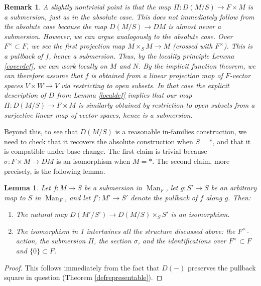 \documentclass[12pt]{article}
\newtheorem{lemma}[theorem]{Lemma}
\newtheorem{remark}[theorem]{Remark}
\newcommand{\on}{\operatorname}
\begin{document}
\begin{remark}
A slightly nontrivial point is that the map $\Pi:D(M/S)\rightarrow F\times M$ is a submersion, just as in the absolute case.  This does not immediately follow from the absolute case because the map $D(M/S)\rightarrow DM$ is almost never a submersion.  However, we can argue analogously to the absolute case.  Over $F^\times \subset F$, we see the first projection map $M\times_S M\rightarrow M$ (crossed with $F^\times$).  This is a pullback of $f$, hence a submersion.  Thus, by the locality principle Lemma \ref{coverdef}, we can work locally on $M$ and $N$.  By the implicit function theorem, we can therefore assume that $f$ is obtained from a linear projection map of $F$-vector spaces $V\times W\rightarrow V$ via restricting to open subsets.  In that case the explicit description of $D$ from Lemma \ref{localdef} implies that our map $\Pi:D(M/S)\rightarrow F\times M$ is similarly obtained by restriction to open subsets from a surjective linear map of vector spaces, hence is a submersion.
\end{remark}

Beyond this, to see that $D(M/S)$ is a reasonable in-families construction, we need to check that it recovers the absolute construction when $S=\ast$, and that it is compatible under base-change.  The first claim is trivial because $\sigma:F\times M\rightarrow DM$ is an isomorphism when $M=\ast$.  The second claim, more precisely, is the following lemma.

\begin{lemma}
Let $f:M\rightarrow S$ be a submersion in $\on{Man}_F$, let $g:S'\rightarrow S$ be an arbitrary map to $S$ in $\on{Man}_F$, and let $f':M'\rightarrow S'$ denote the pullback of $f$ along $g$.  Then:
\begin{enumerate}
\item The natural map $D(M'/S')\rightarrow D(M/S)\times_S S'$ is an isomorphism.
\item The isomorphism in 1 intertwines all the structure discussed above: the $F^\times$-action, the submersion $\Pi$, the section $\sigma$, and the identifications over $F^\times\subset F$ and $\{0\}\subset F$.
\end{enumerate}
\end{lemma}
\begin{proof}
This follows immediately from the fact that $D(-)$ preserves the pullback square in question (Theorem \ref{defrepresentable}).
\end{proof}
\end{document}

